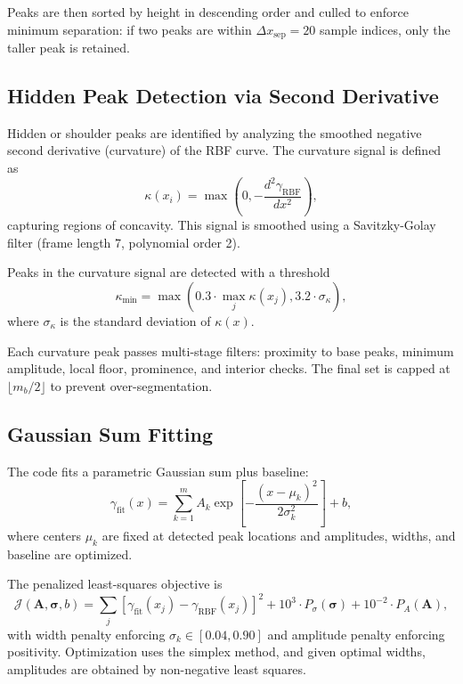 \documentclass[11pt]{article}
\begin{document}
Peaks are then sorted by height in descending order and culled to enforce minimum separation: if two peaks are within $\Delta x_{\mathrm{sep}} = 20$ sample indices, only the taller peak is retained.

\subsection{Hidden Peak Detection via Second Derivative}

Hidden or shoulder peaks are identified by analyzing the smoothed negative second derivative (curvature) of the RBF curve. The curvature signal is defined as
\begin{equation}
\kappa(x_i) = \max\left(0, -\frac{d^2\gamma_{\mathrm{RBF}}}{dx^2}\right),
\end{equation}
capturing regions of concavity. This signal is smoothed using a Savitzky-Golay filter (frame length 7, polynomial order 2).

Peaks in the curvature signal are detected with a threshold
\begin{equation}
\kappa_{\min} = \max\left(0.3 \cdot \max_j \kappa(x_j), 3.2 \cdot \sigma_{\kappa}\right),
\end{equation}
where $\sigma_{\kappa}$ is the standard deviation of $\kappa(x)$.

Each curvature peak passes multi-stage filters: proximity to base peaks, minimum amplitude, local floor, prominence, and interior checks. The final set is capped at $\lfloor m_b / 2 \rfloor$ to prevent over-segmentation.

\subsection{Gaussian Sum Fitting}

The code fits a parametric Gaussian sum plus baseline:
\begin{equation}
\gamma_{\mathrm{fit}}(x) = \sum_{k=1}^{m} A_k \exp\left[-\frac{(x - \mu_k)^2}{2\sigma_k^2}\right] + b,
\end{equation}
where centers $\mu_k$ are fixed at detected peak locations and amplitudes, widths, and baseline are optimized.

The penalized least-squares objective is
\begin{equation}
\mathcal{J}(\mathbf{A}, \boldsymbol{\sigma}, b) = \sum_{j} \left[\gamma_{\mathrm{fit}}(x_j) - \gamma_{\mathrm{RBF}}(x_j)\right]^2 
+ 10^3 \cdot P_\sigma(\boldsymbol{\sigma}) + 10^{-2} \cdot P_A(\mathbf{A}),
\end{equation}
with width penalty enforcing $\sigma_k \in [0.04, 0.90]$ and amplitude penalty enforcing positivity. Optimization uses the simplex method, and given optimal widths, amplitudes are obtained by non-negative least squares.
\end{document}
